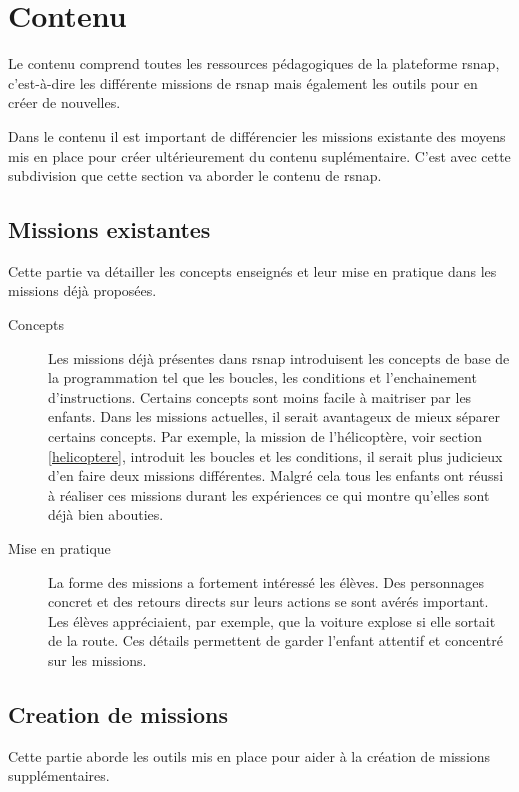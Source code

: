 \section{Contenu}
Le contenu comprend toutes les ressources pédagogiques de la plateforme \gls{rsnap}, c'est-à-dire les différente \glspl{mission} de \gls{rsnap} mais également les outils pour en créer de nouvelles.

Dans le contenu il est important de différencier les \glspl{mission} existante des moyens mis en place pour créer ultérieurement du contenu suplémentaire. C'est avec cette subdivision que cette section va aborder le contenu de \gls{rsnap}.

\subsection{Missions existantes}
Cette partie va détailler les concepts enseignés et leur mise en pratique dans les \glspl{mission} déjà proposées.
\begin{description}
  \item[Concepts] Les \glspl{mission} déjà présentes dans \gls{rsnap} introduisent les concepts de base de la programmation tel que les boucles, les conditions et l'enchainement d'instructions. Certains concepts sont moins facile à maitriser par les enfants. Dans les \glspl{mission} actuelles, il serait avantageux de mieux séparer certains concepts. Par exemple, la \gls{mission} de l'hélicoptère, voir section \ref{helicoptere}, introduit les boucles et les conditions, il serait plus judicieux d'en faire deux \glspl{mission} différentes. Malgré cela tous les enfants ont réussi à réaliser ces \glspl{mission} durant les expériences ce qui montre qu'elles sont déjà bien abouties.

  \item[Mise en pratique] La forme des \glspl{mission} a fortement intéressé les élèves. Des personnages concret et des retours directs sur leurs actions se sont avérés important. Les élèves appréciaient, par exemple, que la voiture explose si elle sortait de la route. Ces détails permettent de garder l'enfant attentif et concentré sur les \glspl{mission}.
\end{description}

\subsection{Creation de missions}
Cette partie aborde les outils mis en place pour aider à la création de \glspl{mission} supplémentaires.

